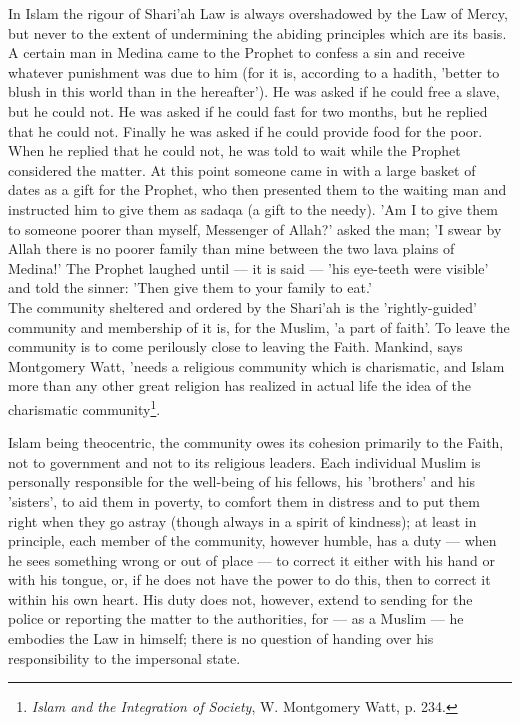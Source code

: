 \documentclass[11pt, b5paper, twoside]{book}
\begin{document}
In Islam the rigour of Shari'ah Law is always overshadowed by the Law of Mercy, but never to the 
extent of undermining the abiding principles which are its basis. A certain man in Medina came to the 
Prophet to confess a sin and receive whatever punishment was due to him (for it is, according to a 
hadith, 'better to blush in this world than in the hereafter'). He was asked if he could free a 
slave, but he could not. He was asked if he could fast for two months, but he replied that he could 
not. Finally he was asked if he could provide food for the poor. When he replied that he could not, 
he was told to wait while the Prophet considered the matter. At this point someone came in with a 
large basket of dates as a gift for the Prophet, who then presented them to the waiting man and 
instructed him to give them as sadaqa (a gift to the needy). 'Am I to give them to someone poorer 
than myself, Messenger of Allah?' asked the man; 'I swear by Allah there is no poorer family than 
mine between the two lava plains of Medina!' The Prophet laughed until --- it is said --- 'his eye-teeth 
were visible' and told the sinner: 'Then give them to your family to eat.' \\

The community sheltered and ordered by the Shari'ah is the 'rightly-guided' community and membership 
of it is, for the Muslim, 'a part of faith'. To leave the community is to come perilously close to 
leaving the Faith. Mankind, says Montgomery Watt, 'needs a religious community which is charismatic, 
and Islam more than any other great religion has realized in actual life the idea of the charismatic 
community\footnote{\emph{Islam and the Integration of Society}, W. Montgomery Watt, p. 234.}.

Islam being theocentric, the community owes its cohesion primarily to the Faith, not to government 
and not to its religious leaders. Each individual Muslim is personally responsible for the well-being 
of his fellows, his 'brothers' and his 'sisters', to aid them in poverty, to comfort them in distress 
and to put them right when they go astray (though always in a spirit of kindness); at least in 
principle, each member of the community, however humble, has a duty --- when he sees something wrong or 
out of place --- to correct it either with his hand or with his tongue, or, if he does not have the 
power to do this, then to correct it within his own heart. His duty does not, however, extend to 
sending for the police or reporting the matter to the authorities, for --- as a Muslim --- he embodies 
the Law in himself; there is no question of handing over his responsibility to the impersonal state. \\
\end{document}
